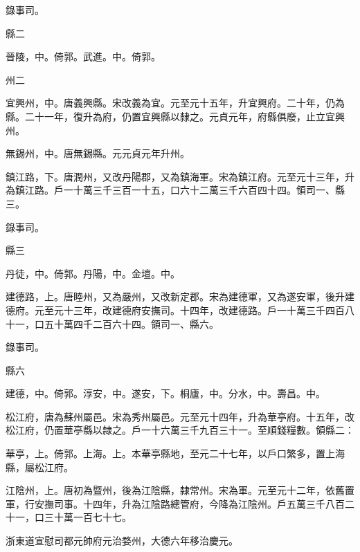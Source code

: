 \begin{pinyinscope}
 錄事司。



 縣二



 晉陵，中。倚郭。武進。中。倚郭。



 州二



 宜興州，中。唐義興縣。宋改義為宜。元至元十五年，升宜興府。二十年，仍為縣。二十一年，復升為府，仍置宜興縣以隸之。元貞元年，府縣俱廢，止立宜興州。



 無錫州，中。唐無錫縣。元元貞元年升州。



 鎮江路，下。唐潤州，又改丹陽郡，又為鎮海軍。宋為鎮江府。元至元十三年，升為鎮江路。戶一十萬三千三百一十五，口六十二萬三千六百四十四。領司一、縣三。



 錄事司。



 縣三



 丹徒，中。倚郭。丹陽，中。金壇。中。



 建德路，上。唐睦州，又為嚴州，又改新定郡。宋為建德軍，又為遂安軍，後升建德府。元至元十三年，改建德府安撫司。十四年，改建德路。戶一十萬三千四百八十一，口五十萬四千二百六十四。領司一、縣六。



 錄事司。



 縣六



 建德，中。倚郭。淳安，中。遂安，下。桐廬，中。分水，中。壽昌。中。



 松江府，唐為蘇州屬邑。宋為秀州屬邑。元至元十四年，升為華亭府。十五年，改松江府，仍置華亭縣以隸之。戶一十六萬三千九百三十一。至順錢糧數。領縣二：



 華亭，上。倚郭。上海。上。本華亭縣地，至元二十七年，以戶口繁多，置上海縣，屬松江府。



 江陰州，上。唐初為暨州，後為江陰縣，隸常州。宋為軍。元至元十二年，依舊置軍，行安撫司事。十四年，升為江陰路總管府，今降為江陰州。戶五萬三千八百二十一，口三十萬一百七十七。



 浙東道宣慰司都元帥府元治婺州，大德六年移治慶元。




\end{pinyinscope}
